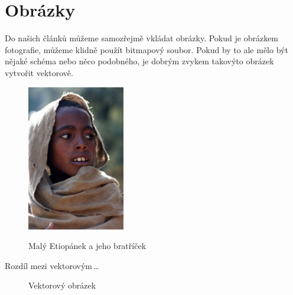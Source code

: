 \documentclass[a4paper, 11pt]{article}
\begin{document}
  \section{Obrázky}
  Do našich článků můžeme samozřejmě vkládat obrázky. Pokud je obrázkem 
  fotografie, můžeme klidně použít bitmapový soubor. Pokud by to ale
  mělo být nějaké schéma nebo něco podobného, je dobrým zvykem takovýto
  obrázek vytvořit vektorově.

  \begin{figure}[h]
    \centering
    \includegraphics[width=4.25cm]{./src/etiopan.eps}\,
    \caption{Malý Etiopánek a jeho bratříček}
    \label{obr1}
  \end{figure}

  \newpage

  Rozdíl mezi vektorovým\,\dots
   
  \begin{figure}[h]
    \centering
    \caption{Vektorový obrázek}
    \label{obr2}
  \end{figure}
\end{document}
